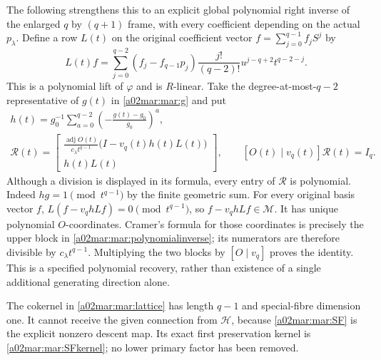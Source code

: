 \documentclass[11pt,a4paper]{article}
\begin{document}
The following strengthens this to an explicit global polynomial
right inverse of the enlarged $q$ by $(q+1)$ frame, with every
coefficient depending on the actual $p_\lambda$. Define a row
$L(t)$ on the original coefficient vector $f=\sum_{j=0}^{q-1}f_jS^j$ by
\begin{equation}\tag{MAR15}\label{a02mar:mar:liftrow}
 L(t)f=\sum_{j=0}^{q-2}(f_j-f_{q-1}p_j)
              \frac{j!}{(q-2)!}u^{j-q+2}t^{q-2-j}.
\end{equation}
This is a polynomial lift of $\varphi$ and is $R$-linear.
Take the degree-at-most-$q-2$ representative of $g(t)$ in
\eqref{a02mar:mar:g} and put
\begin{equation}\tag{MAR16}\label{a02mar:mar:polynomialinverse}
 \begin{gathered}
 h(t)=g_0^{-1}\sum_{a=0}^{q-2}
               \left(-\frac{g(t)-g_0}{g_0}\right)^a,\\
 \mathcal R(t)=
 \begin{bmatrix}
 \displaystyle\frac{\operatorname{adj}O(t)}{c_\lambda t^{q-1}}
                   \bigl(I-v_q(t)h(t)L(t)\bigr)\\[3pt]
 h(t)L(t)
 \end{bmatrix},\qquad
 [O(t)\mid v_q(t)]\mathcal R(t)=I_q.
 \end{gathered}
\end{equation}
Although a division is displayed in its formula, every entry of
$\mathcal R$ is polynomial. Indeed $h g=1\pmod{t^{q-1}}$ by
the finite geometric sum. For every original basis vector $f$,
$L(f-v_qhLf)=0\pmod{t^{q-1}}$, so $f-v_qhLf\in\mathscr M$.
It has unique polynomial $O$-coordinates. Cramer's formula for those
coordinates is precisely the upper block in \eqref{a02mar:mar:polynomialinverse};
its numerators are therefore divisible by $c_\lambda t^{q-1}$.
Multiplying the two blocks by $[O\mid v_q]$ proves the identity.
This is a specified polynomial recovery, rather than existence of a
single additional generating direction alone.

The cokernel in \eqref{a02mar:mar:lattice} has length $q-1$ and special-fibre
dimension one. It cannot receive the given connection from
$\mathscr H$, because \eqref{a02mar:mar:SF} is the explicit nonzero descent
map. Its exact first preservation kernel is
\eqref{a02mar:mar:SFkernel}; no lower primary factor has been removed.
\end{document}
